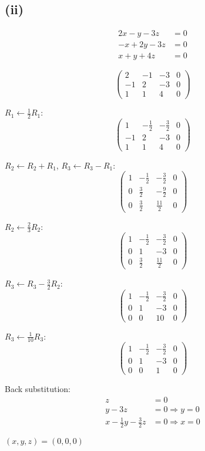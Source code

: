 \subsection*{(ii)}
\begin{align*}
	2x - y - 3z  & = 0 \\
	-x + 2y - 3z & = 0 \\
	x + y + 4z   & = 0
\end{align*}

\[
	\left(\begin{array}{ccc|c}
			2  & -1 & -3 & 0 \\
			-1 & 2  & -3 & 0 \\
			1  & 1  & 4  & 0
		\end{array}\right)
\]

$R_1 \leftarrow \frac{1}{2}R_1$:
\[
	\left(\begin{array}{ccc|c}
			1  & -\frac{1}{2} & -\frac{3}{2} & 0 \\
			-1 & 2           & -3           & 0 \\
			1  & 1           & 4            & 0
		\end{array}\right)
\]

$R_2 \leftarrow R_2 + R_1$, $R_3 \leftarrow R_3 - R_1$:
\[
	\left(\begin{array}{ccc|c}
			1 & -\frac{1}{2} & -\frac{3}{2} & 0 \\
			0 & \frac{3}{2}  & -\frac{9}{2} & 0 \\
			0 & \frac{3}{2}  & \frac{11}{2} & 0
		\end{array}\right)
\]

$R_2 \leftarrow \frac{2}{3}R_2$:
\[
	\left(\begin{array}{ccc|c}
			1 & -\frac{1}{2} & -\frac{3}{2} & 0 \\
			0 & 1           & -3           & 0 \\
			0 & \frac{3}{2}  & \frac{11}{2} & 0
		\end{array}\right)
\]

$R_3 \leftarrow R_3 - \frac{3}{2}R_2$:
\[
	\left(\begin{array}{ccc|c}
			1 & -\frac{1}{2} & -\frac{3}{2} & 0 \\
			0 & 1           & -3           & 0 \\
			0 & 0           & 10           & 0
		\end{array}\right)
\]

$R_3 \leftarrow \frac{1}{10}R_3$:
\[
	\left(\begin{array}{ccc|c}
			1 & -\frac{1}{2} & -\frac{3}{2} & 0 \\
			0 & 1           & -3           & 0 \\
			0 & 0           & 1            & 0
		\end{array}\right)
\]

Back substitution:
\begin{align*}
	z &= 0 \\
	y - 3z &= 0 \Rightarrow y = 0 \\
	x - \frac{1}{2}y - \frac{3}{2}z &= 0 \Rightarrow x = 0
\end{align*}

$\boxed{(x, y, z) = (0, 0, 0)}$